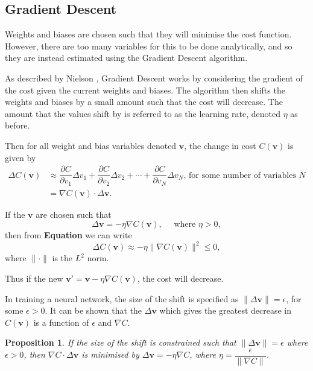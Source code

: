 \documentclass[honours,12pt]{unswthesis}
\newtheorem{proposition}[theorem]{Proposition}
\numberwithin{equation}{section}
\begin{document}
\subsection{Gradient Descent}\label{nnets-graddesc}

Weights and biases are chosen such that they will minimise the cost function. However, there are too many variables for this to be done analytically, and so they are instead estimated using the Gradient Descent algorithm.

As described by Nielson \cite{Nielson2015}, Gradient Descent works by considering the gradient of the cost given the current weights and biases. The algorithm then shifts the weights and biases by a small amount such that the cost will decrease. The amount that the values shift by is referred to as the learning rate, denoted $\eta$ as before.

Then for all weight and bias variables denoted $\mathbf{v}$, the change in cost $C(\mathbf{v})$ is given by
\begin{align*}
	\Delta C(\mathbf{v}) & \approx \dfrac{\partial C}{\partial v_1}\Delta v_1 + \dfrac{\partial C}{\partial v_2}\Delta v_2 + \cdots + \dfrac{\partial C}{\partial v_N}\Delta v_N\text{, for some number of variables } N\\
	& = \nabla C(\mathbf{v})\cdot \Delta \mathbf{v}.
\end{align*}

If the $\mathbf{v}$ are chosen such that
\[
	\Delta\mathbf{v} = -\eta \nabla C(\mathbf{v}), \quad \text{ where }\eta > 0,
\]
then from \textbf{Equation} we can write
\[
	\Delta C(\mathbf{v}) \approx -\eta \|\nabla C(\mathbf{v})\|^2 \le 0,
\]
where $\|\cdot\|$ is the $L^2$ norm.

Thus if the new $\mathbf{v}' = \mathbf{v} - \eta \nabla C(\mathbf{v})$, the cost will decrease.

In training a neural network, the size of the shift is specified as $\|\Delta\mathbf{v}\| = \epsilon$, for some $\epsilon > 0$. It can be shown that the $\Delta\mathbf{v}$ which gives the greatest decrease in $C(\mathbf{v})$ is a function of $\epsilon$ and $\nabla C$.

\begin{proposition}\label{nnets-graddescminproof}
	If the size of the shift is constrained such that $\|\Delta\mathbf{v}\| = \epsilon$ where $\epsilon > 0$, then $\nabla C \cdot \Delta\mathbf{v}$ is minimised by $\Delta\mathbf{v} = -\eta\nabla C$, where $\eta = \dfrac{\epsilon}{\|\nabla C\|}$.
\end{proposition}
\end{document}
